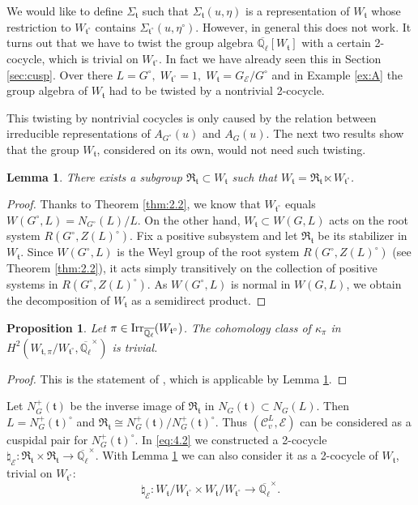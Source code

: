\documentclass[11pt]{amsart}
\newtheorem{lem}[thm]{Lemma}
\newtheorem{prop}[thm]{Proposition}
\theoremstyle{definition}
\newcommand{\Q}{\mathbb Q}
\def\Irr{{\rm Irr}}
\def\cC{{\mathcal C}}
\def\cE{{\mathcal E}}
\def\cR{{\mathfrak R}}
\def\ft{{\mathfrak t}}
\begin{document}
We would like to define $\Sigma_\ft$ such that $\Sigma_\ft(u,\eta)$
is a representation of $W_\ft$ whose restriction to $W_{\ft^\circ}$ contains
$\Sigma_{\ft^\circ} (u,\eta^\circ)$. However, in general this does not work. 
It turns out that we have to twist the group algebra $\overline{\Q_{\ell}} [W_\ft]$ 
with a certain 2-cocycle, which is trivial on $W_{\ft^\circ}$. 
In fact we have already seen this in Section \ref{sec:cusp}. Over there
$L = G^\circ ,\; W_{\ft^\circ} = 1 ,\; W_\ft = G_\cE / G^\circ$ and in 
Example \ref{ex:A} the group algebra of $W_\ft$ had to be twisted by a 
nontrivial 2-cocycle.

This twisting by nontrivial cocycles is only caused by the relation between 
irreducible representations of $A_{G^\circ}(u)$ and $A_G (u)$. The next
two results show that the group $W_\ft$, considered on its own, would not
need such twisting.

\begin{lem}\label{lem:5.1}
There exists a subgroup $\cR_\ft \subset W_\ft$ such that
$W_\ft = \cR_\ft \ltimes W_{\ft^\circ}$. 
\end{lem}
\begin{proof}
Thanks to Theorem \ref{thm:2.2}, we know that $W_{\ft^\circ}$ equals 
$W(G^\circ,L)=N_{G^\circ}(L) / L$. On the other hand, $W_\ft \subset W(G,L)$ acts 
on the root system $R(G^\circ,Z(L)^\circ)$.
Fix a positive subsystem and let $\cR_\ft$ be its stabilizer in
$W_\ft$. Since $W(G^\circ,L)$ is the Weyl group of the root system 
$R(G^\circ,Z(L)^\circ)$ (see Theorem \ref{thm:2.2}), it acts simply transitively
on the collection of positive systems in $R(G^\circ,Z(L)^\circ)$. As
$W(G^\circ,L)$ is normal in $W(G,L)$, we obtain the decomposition of
$W_\ft$ as a semidirect product.
\end{proof}

\begin{prop}\label{prop:5.7}
Let $\pi \in \Irr_{\overline{\Q_{\ell}}} (W_{\ft^\circ})$. 
The cohomology class of $\kappa_\pi$ in \\ 
$H^2 (W_{\ft,\pi} / W_{\ft^\circ},\overline{\Q_{\ell}}^\times)$ is trivial. 
\end{prop}
\begin{proof}
This is the statement of \cite[Proposition 4.3]{ABPS5}, which is applicable
by Lemma \ref{lem:5.1}.
\end{proof}

Let $N_G^+ (\ft)$ be the inverse image of $\cR_\ft$ in $N_G (\ft) \subset N_G (L)$.
Then $L = N_G^+ (\ft)^\circ$ and $\cR_\ft \cong N_G^+ (\ft) / N_G^+ (\ft)^\circ$.
Thus $(\cC_v^L,\cE)$ can be considered as a cuspidal pair for $N_G^+ (\ft)^\circ$. 
In \eqref{eq:4.2} we constructed a 2-cocycle 
$\natural_\cE : \cR_\ft \times \cR_\ft \to \overline{\Q_{\ell}}^\times$.
With Lemma \ref{lem:5.1} we can also consider it as a 2-cocycle of
$W_\ft$, trivial on $W_{\ft^\circ}$:
\begin{equation}\label{eq:5.3}
\natural_\cE : W_\ft / W_{\ft^\circ} \times  W_\ft / W_{\ft^\circ}  
\to \overline{\Q_{\ell}}^\times .
\end{equation}
\end{document}
